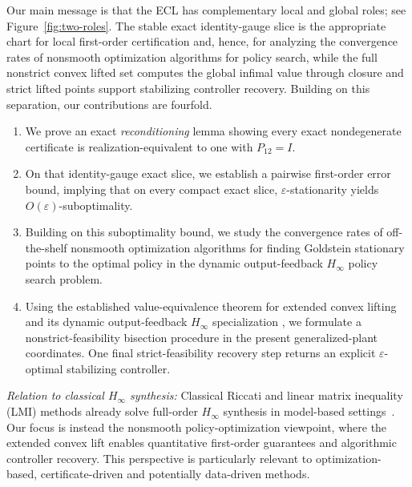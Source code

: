 \documentclass[letterpaper,10pt,conference]{ieeeconf}
\renewcommand{\^}[1]{^{(#1)}}
\begin{document}
Our main message is that the ECL has complementary local and global roles; see Figure~\ref{fig:two-roles}. The stable exact identity-gauge slice is the appropriate chart for local first-order certification and, hence, for analyzing the convergence rates of nonsmooth optimization algorithms for policy search, while the full nonstrict convex lifted set computes the global infimal value through closure and strict lifted points support stabilizing controller recovery. Building on this separation, our contributions are fourfold.
\begin{enumerate}
    \item We prove an exact \emph{reconditioning} lemma showing every exact nondegenerate certificate is realization-equivalent to one with $P_{12}=I$.
    \item On that identity-gauge exact slice, we establish a pairwise first-order error bound, implying that on every compact exact slice, $\varepsilon$-stationarity yields $O(\varepsilon)$-suboptimality.
    \item Building on this suboptimality bound, we study the convergence rates of off-the-shelf nonsmooth optimization algorithms for finding Goldstein stationary points to the optimal policy in the dynamic output-feedback $H_\infty$ policy search problem.
    \item Using the established value-equivalence theorem for extended convex lifting and its dynamic output-feedback $H_\infty$ specialization \citep[Theorem~2.1 and Corollary~4.1]{zheng2025extended}, we formulate a nonstrict-feasibility bisection procedure in the present generalized-plant coordinates. One final strict-feasibility recovery step returns an explicit $\varepsilon$-optimal stabilizing controller.
\end{enumerate}

\emph{Relation to classical $H_\infty$ synthesis:} Classical Riccati and linear matrix inequality (LMI) methods already solve full-order $H_\infty$ synthesis in model-based settings~\citep{doyle1988state,masubuchi1998lmi}. Our focus is instead the nonsmooth policy-optimization viewpoint, where the extended convex lift enables quantitative first-order guarantees and algorithmic controller recovery. This perspective is particularly relevant to optimization-based, certificate-driven and potentially data-driven methods.
\end{document}
